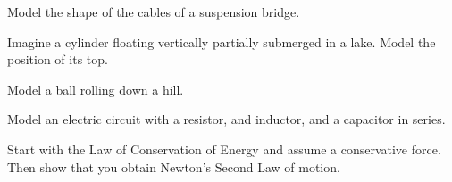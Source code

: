 \begin{exercises}
\begin{problist}
	\prob Model the shape of the cables of a suspension bridge.
	
	\prob Imagine a cylinder floating vertically partially submerged in a lake. Model the position of its top.
	
	\prob Model a ball rolling down a hill.
	
	\prob Model an electric circuit with a resistor, and inductor, and a capacitor in series.
	
	\prob Start with the Law of Conservation of Energy and assume a conservative force. Then show that you obtain Newton's Second Law of motion.
	
	\end{problist}
\end{exercises}
